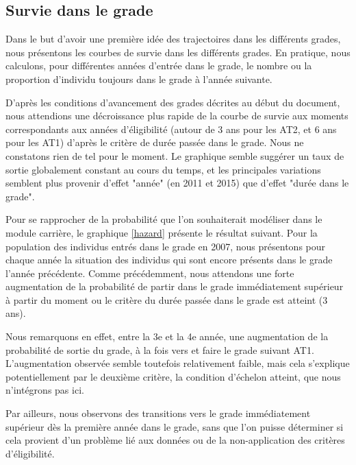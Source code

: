 \documentclass[11pt,a4paper]{article}
\begin{document}
\medskip









\subsection{Survie dans le grade}


Dans le but d'avoir une première idée des trajectoires dans les différents grades, nous présentons les courbes de survie dans les différents grades. En pratique, nous calculons, pour différentes années d'entrée dans le grade, le nombre ou la proportion d'individu toujours dans le grade à l'année suivante. 

D'après les conditions d'avancement des grades décrites au début du document, nous attendions une décroissance plus rapide de la courbe de survie aux moments correspondants aux années d'éligibilité (autour de 3 ans pour les AT2, et 6 ans pour les AT1) d'après le critère de durée passée dans le grade. Nous ne constatons rien de tel pour le moment. Le graphique semble suggérer un taux de sortie globalement constant au cours du temps, et les principales variations semblent plus provenir d'effet "année" (en 2011 et 2015) que d'effet "durée dans le grade". 

\medskip

Pour se rapprocher de la probabilité que l'on souhaiterait modéliser dans le module carrière, le graphique \ref{hazard} présente le résultat suivant. Pour la population des individus entrés dans le grade en 2007, nous présentons pour chaque année la situation des individus qui sont encore présents dans le grade l'année précédente. Comme précédemment, nous attendons une forte augmentation de la probabilité de partir dans le grade immédiatement supérieur à partir du moment ou le critère du durée passée dans le grade est atteint (3 ans). 

Nous remarquons en effet, entre la 3e et la 4e année, une augmentation de la probabilité de sortie du grade, à la fois vers et faire le grade suivant AT1. L'augmentation observée semble toutefois relativement faible, mais cela s'explique potentiellement par le deuxième critère, la condition d'échelon atteint, que nous n'intégrons pas ici. 

Par ailleurs, nous observons des transitions vers le grade immédiatement supérieur dès la première année dans le grade, sans que l'on puisse déterminer si cela provient d'un problème lié aux données ou de la non-application des critères d'éligibilité. 
\end{document}
